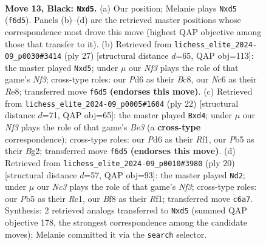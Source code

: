 \documentclass[11pt]{article}
\begin{document}
\clearpage

\begin{figure}[p]\centering
\begin{subfigure}{0.46\textwidth}\centering
\resizebox{\linewidth}{!}{%
\newchessgame
\chessboard[
  setfen={r2qrbk1/1bp2pp1/p1np1n1p/1p1Np3/4P3/PB1P1N1P/1PPB1PP1/R2QR1K1 b - - 4 13},
  showmover=false,
  pgfstyle=straightmove, color=movearrow, markmove={f6-d5}
]}
\caption{}
\end{subfigure}\hfill
\begin{subfigure}{0.46\textwidth}\centering
\resizebox{\linewidth}{!}{%
\newchessgame
\chessboard[
  setfen={1rbqrbk1/2p2pp1/2np1n1p/1p1Np3/4P3/1BPPBN1P/1P3PP1/R2Q1RK1 b - - 2 14},
  showmover=false,
  pgfstyle=straightmove, color=movearrow, markmove={f6-d5}
]}
\caption{}
\end{subfigure}
\\[4pt]
\begin{subfigure}{0.46\textwidth}\centering
\resizebox{\linewidth}{!}{%
\newchessgame
\chessboard[
  setfen={r2q1rk1/1pp2pp1/3pbn1p/2b1p3/p2nP3/P1NPBNPP/1PP2PBK/R2Q1R2 w - - 4 12},
  showmover=false,
  pgfstyle=straightmove, color=movearrow, markmove={e3-d4}
]}
\caption{}
\end{subfigure}\hfill
\begin{subfigure}{0.46\textwidth}\centering
\resizebox{\linewidth}{!}{%
\newchessgame
\chessboard[
  setfen={r2q1rk1/pp1nbpp1/2p1p2p/3p1b2/2PPn3/1PN2NP1/PB2PPBP/2RQ1RK1 w - - 5 11},
  showmover=false,
  pgfstyle=straightmove, color=movearrow, markmove={f3-d2}
]}
\caption{}
\end{subfigure}
\caption{\textbf{Move 13, Black: \texttt{Nxd5}.} (a) Our position; Melanie plays \texttt{Nxd5} (\texttt{f6d5}). Panels (b)--(d) are the retrieved master positions whose correspondence most drove this move (highest QAP objective among those that transfer to it). (b) Retrieved from \texttt{lichess\_elite\_2024-09\_p0030\#3414} (ply 27) [structural distance $d$=65, QAP obj=113]: the master played \texttt{Nxd5}; under $\mu$ our \emph{Nf3} plays the role of that game's \emph{Nf3}; cross-type roles: our \emph{P}d6 as their \emph{B}c8, our \emph{N}c6 as their \emph{R}e8; transferred move \texttt{f6d5} \textbf{(endorses this move)}. (c) Retrieved from \texttt{lichess\_elite\_2024-09\_p0005\#1604} (ply 22) [structural distance $d$=71, QAP obj=65]: the master played \texttt{Bxd4}; under $\mu$ our \emph{Nf3} plays the role of that game's \emph{Be3} (a \textbf{cross-type} correspondence); cross-type roles: our \emph{P}d6 as their \emph{R}f1, our \emph{P}b5 as their \emph{B}g2; transferred move \texttt{f6d5} \textbf{(endorses this move)}. (d) Retrieved from \texttt{lichess\_elite\_2024-09\_p0010\#3980} (ply 20) [structural distance $d$=57, QAP obj=93]: the master played \texttt{Nd2}; under $\mu$ our \emph{Nc3} plays the role of that game's \emph{Nf3}; cross-type roles: our \emph{P}b5 as their \emph{R}c1, our \emph{B}f8 as their \emph{R}f1; transferred move \texttt{c6a7}. Synthesis: 2 retrieved analogs transferred to \texttt{Nxd5} (summed QAP objective 178, the strongest correspondence among the candidate moves); Melanie committed it via the \texttt{search} selector.}
\label{fig:thought-m25}
\end{figure}
\end{document}
